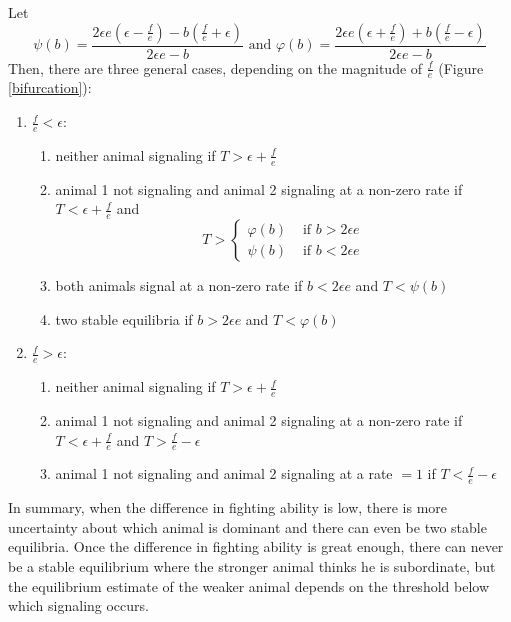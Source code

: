 \documentclass{article}
\begin{document}
Let $$\psi(b)=\frac{2\epsilon e(\epsilon -\frac{f}{e})-b(\frac{f}{e}+\epsilon)}{2\epsilon e-b} \text{ and } \varphi(b)=\frac{ 2\epsilon e(\epsilon+\frac{f}{e})+b(\frac{f}{e}-\epsilon)}{2\epsilon e-b}$$
Then, there are three general cases, depending on the magnitude of $\frac{f}{e}$ (Figure \ref{bifurcation}):
\begin{enumerate}
\item $\frac{f}{e}<\epsilon$:
\begin{enumerate}
\item neither animal signaling if $T>\epsilon+\frac{f}{e}$
\item animal 1 not signaling and animal 2 signaling at a non-zero rate if $T<\epsilon+\frac{f}{e}$ and 
$$T>\left\{\begin{array}{cccc}
\varphi(b) & \text{ if } b>2\epsilon e
\\ \psi(b) & \text{ if } b<2\epsilon e
\end{array}\right.$$

\item both animals signal at a non-zero rate if $b<2\epsilon e$ and $T<\psi(b)$
\item two stable equilibria if $b>2\epsilon e$ and $T<\varphi(b)$
\end{enumerate}
\item $\frac{f}{e}>\epsilon$:
\begin{enumerate}
\item neither animal signaling if $T>\epsilon+\frac{f}{e}$
\item animal 1 not signaling and animal 2 signaling at a non-zero rate if $T<\epsilon+\frac{f}{e}$ and $T>\frac{f}{e}-\epsilon$
\item animal 1 not signaling and animal 2 signaling at a rate $=1$ if $T<\frac{f}{e}-\epsilon$
\end{enumerate}
\end{enumerate}
In summary, when the difference in fighting ability is low, there is more uncertainty about which animal is dominant and there can even be two stable equilibria.  Once the difference in fighting ability is great enough, there can never be a stable equilibrium where the stronger animal thinks he is subordinate, but the equilibrium estimate of the weaker animal depends on the threshold below which signaling occurs.
\end{document}
